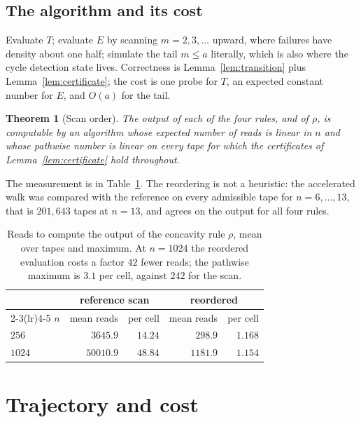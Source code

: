 \documentclass[11pt]{article}
\newtheorem{theorem}{Theorem}
\begin{document}
\subsection{The algorithm and its cost}

Evaluate $T$; evaluate $E$ by scanning $m=2,3,\dots$ upward, where failures have density
about one half; simulate the tail $m\le a$ literally, which is also where the cycle
detection state lives. Correctness is Lemma~\ref{lem:transition} plus
Lemma~\ref{lem:certificate}; the cost is one probe for $T$, an expected constant number
for $E$, and $O(a)$ for the tail.

\begin{theorem}[Scan order]\label{thm:order}
The output of each of the four rules, and of $\rho$, is computable by an algorithm whose
expected number of reads is linear in $n$ and whose pathwise number is linear on every
tape for which the certificates of Lemma~\ref{lem:certificate} hold throughout.
\end{theorem}

The measurement is in Table~\ref{tab:order}. The reordering is not a heuristic: the
accelerated walk was compared with the reference on every admissible tape for
$n=6,\dots,13$, that is $201{,}643$ tapes at $n=13$, and agrees on the output for all four
rules.

\begin{table}[h]
\begin{center}
\begin{tabular}{lrrrr}
\toprule
& \multicolumn{2}{c}{reference scan} & \multicolumn{2}{c}{reordered} \\
\cmidrule(lr){2-3}\cmidrule(lr){4-5}
$n$ & mean reads & per cell & mean reads & per cell \\
\midrule
$256$  & $3645.9$  & $14.24$ & $298.9$  & $1.168$ \\
$1024$ & $50010.9$ & $48.84$ & $1181.9$ & $1.154$ \\
\bottomrule
\end{tabular}
\caption{Reads to compute the output of the concavity rule $\rho$, mean over tapes and
maximum. At $n=1024$ the reordered evaluation costs a factor $42$ fewer reads; the
pathwise maximum is $3.1$ per cell, against $242$ for the scan.}
\label{tab:order}
\end{center}
\end{table}

\section{Trajectory and cost}\label{sec:trajectory}
\end{document}
